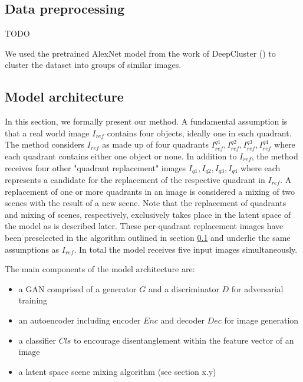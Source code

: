 \documentclass[11pt,a4paper]{article}
\begin{document}
\subsection{Data preprocessing} \label{data_preprocessing}
TODO
\par We used the pretrained AlexNet model from the work of DeepCluster (\cite{1807.05520}) to cluster the dataset into groups of similar images.

\subsection{Model architecture}
In this section, we formally present our method. A fundamental assumption is that a real world image $I_{ref}$ contains four objects, ideally one in each quadrant. The method considers $I_{ref}$ as made up of four quadrants $I^{q1}_{ref}, I^{q2}_{ref}, I^{q3}_{ref}, I^{q4}_{ref}$ where each quadrant contains either one object or none. In addition to $I_{ref}$, the method receives four other "quadrant replacement" images $I_{q1},I_{q2},I_{q3},I_{q4}$ where each represents a candidate for the replacement of the respective quadrant in $I_{ref}$. A replacement of one or more quadrants in an image is considered a mixing of two scenes with the result of a new scene. Note that the replacement of quadrants and mixing of scenes, respectively, exclusively takes place in the latent space of the model as is described later. These per-quadrant replacement images have been preselected in the algorithm outlined in section \ref{data_preprocessing} and underlie the same assumptions as $I_{ref}$. In total the model receives five input images simultaneously.

The main components of the model architecture are:

\begin{itemize}
   \item a GAN comprised of a generator $G$ and a discriminator $D$ for adversarial training
   \item an autoencoder including encoder $Enc$ and decoder $Dec$ for image generation
   \item a classifier $Cls$ to encourage disentanglement within the feature vector of an image
   \item a latent space scene mixing algorithm (see section x.y)
\end{itemize}
 
\end{document}
